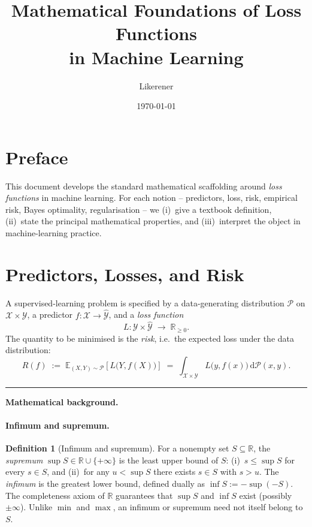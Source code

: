 \documentclass[11pt]{article}
\title{Mathematical Foundations of Loss Functions\\ in Machine Learning}
\author{Likerener}
\date{\today}
\theoremstyle{definition}
\newtheorem{definition}{Definition}
\begin{document}
\maketitle

\section*{Preface}

This document develops the standard mathematical scaffolding around
\emph{loss functions} in machine learning. For each notion -- predictors,
loss, risk, empirical risk, Bayes optimality, regularisation -- we (i)~give
a textbook definition, (ii)~state the principal mathematical properties, and
(iii)~interpret the object in machine-learning practice. 


\section{Predictors, Losses, and Risk}

A supervised-learning problem is specified by a data-generating distribution
$\mathcal{P}$ on $\mathcal{X} \times \mathcal{Y}$, a predictor
$f : \mathcal{X} \to \widehat{\mathcal{Y}}$, and a \emph{loss function}
\[
  L : \mathcal{Y} \times \widehat{\mathcal{Y}} \;\longrightarrow\; \mathbb{R}_{\geq 0}.
\]
The quantity to be minimised is the \emph{risk}, i.e.\ the expected loss
under the data distribution:
\[
  R(f) \;:=\; \mathbb{E}_{(X, Y) \sim \mathcal{P}}\!\left[L\bigl(Y, f(X)\bigr)\right]
  \;=\; \int_{\mathcal{X} \times \mathcal{Y}} L\bigl(y, f(x)\bigr)\, \mathrm{d}\mathcal{P}(x, y).
\]

\bigskip
\hrule
\bigskip

\noindent\textbf{Mathematical background.}

\paragraph{Infimum and supremum.}

\begin{definition}[Infimum and supremum]
For a nonempty set $S \subseteq \mathbb{R}$, the \emph{supremum}
$\sup S \in \mathbb{R} \cup \{+\infty\}$ is the least upper bound of $S$:
(i)~$s \leq \sup S$ for every $s \in S$, and (ii)~for any $u < \sup S$
there exists $s \in S$ with $s > u$. The \emph{infimum} is the greatest
lower bound, defined dually as $\inf S := -\sup(-S)$. The completeness
axiom of $\mathbb{R}$ guarantees that $\sup S$ and $\inf S$ exist (possibly
$\pm\infty$). Unlike $\min$ and $\max$, an infimum or supremum need not
itself belong to $S$.
\end{definition}
\end{document}
